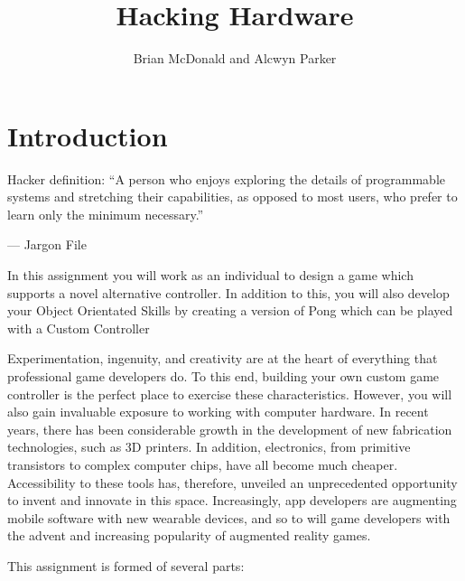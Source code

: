 \documentclass{../../fal_assignment}
\title{Hacking Hardware}
\author{Brian McDonald and Alcwyn Parker}
\begin{document}
	
	\maketitle
	
	\section*{Introduction}
	
	\begin{marginquote}
		Hacker definition: ``A person who enjoys exploring the details of programmable systems and stretching their capabilities, as opposed to most users, who prefer to learn only the minimum necessary.''
		
		--- Jargon File
		
	\end{marginquote}
	
	In this assignment you will work as an individual to design a game which supports a novel alternative controller. In addition to this, you will also develop your Object Orientated Skills by creating a version of Pong which can be played with a Custom Controller
	
	Experimentation, ingenuity, and creativity are at the heart of everything that professional game developers do. To this end, building your own custom game controller is the perfect place to exercise these characteristics. However, you will also gain invaluable exposure to working with computer hardware. In recent years, there has been considerable growth in the development of new fabrication technologies, such as 3D printers. In addition, electronics, from primitive transistors to complex computer chips, have all become much cheaper. Accessibility to these tools has, therefore, unveiled an unprecedented opportunity to invent and innovate in this space. Increasingly, app developers are augmenting mobile software with new wearable devices, and so to will game developers with the advent and increasing popularity of augmented reality games.
	
	This assignment is formed of several parts:
	
\end{document}
